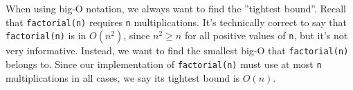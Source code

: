 When using big-O notation, we always want to find the ''tightest bound''. Recall
that \texttt{factorial(n)} requires \texttt{n} multiplications. It's technically correct to
say that \texttt{factorial(n)} is in $O(n^2)$, since $n^2 \geq n$ for all positive
values of \texttt{n}, but it's not very informative. Instead, we want to find the
smallest big-O that \texttt{factorial(n)} belongs to. Since our implementation of
\texttt{factorial(n)} must use at most \texttt{n} multiplications in all cases, we say its
tightest bound is $O(n)$.
